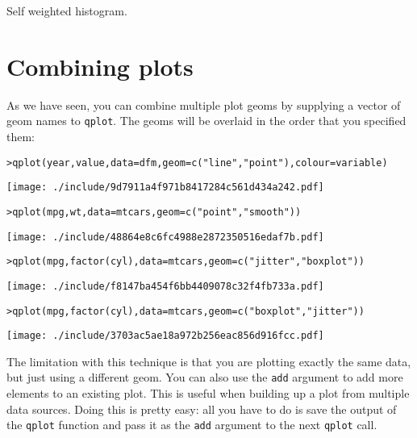 Self weighted histogram.

\section{Combining plots}\label{sec:combining_plots}

As we have seen, you can combine multiple plot geoms by supplying a vector of geom names to {\tt qplot}.  The geoms will be overlaid in the order that you specified them:

\begin{alltt}
> qplot(year, value, data = dfm, geom = c("line", "point"), colour = variable)
\end{alltt}
\texttt{[image: ./include/9d7911a4f971b8417284c561d434a242.pdf]}
\begin{alltt}

> qplot(mpg, wt, data = mtcars, geom = c("point", "smooth"))
\end{alltt}
\texttt{[image: ./include/48864e8c6fc4988e2872350516edaf7b.pdf]}
\begin{alltt}

> qplot(mpg, factor(cyl), data = mtcars, geom = c("jitter", "boxplot"))
\end{alltt}
\texttt{[image: ./include/f8147ba454f6bb4409078c32f4fb733a.pdf]}
\begin{alltt}

> qplot(mpg, factor(cyl), data = mtcars, geom = c("boxplot", "jitter"))
\end{alltt}
\texttt{[image: ./include/3703ac5ae18a972b256eac856d916fcc.pdf]}
\begin{alltt}

\end{alltt}

The limitation with this technique is that you are plotting exactly the same data, but just using a different geom.  You can also use the {\tt add} argument to add more elements to an existing plot.  This is useful when building up a plot from multiple data sources. Doing this is pretty easy: all you have to do is save the output of the {\tt qplot} function and pass it as the {\tt add} argument to the next {\tt qplot} call.


